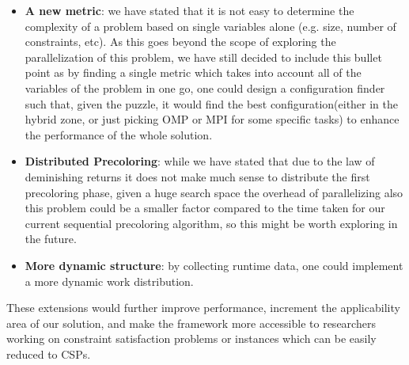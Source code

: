 \begin{itemize}
    \item \textbf{A new metric}: we have stated that it is not easy to determine the complexity of a problem based on single variables alone (e.g. size, number of constraints, etc). As this goes beyond the scope of exploring the parallelization of this problem, we have still decided to include this bullet point as by finding a single metric which takes into account all of the variables of the problem in one go, one could design a configuration finder such that, given the puzzle, it would find the best configuration(either in the hybrid zone, or just picking OMP or MPI for some specific tasks) to enhance the performance of the whole solution.

    \item \textbf{Distributed Precoloring}: while we have stated that due to the law of deminishing returns it does not make much sense to distribute the first precoloring phase, given a huge search space the overhead of parallelizing also this problem could be a smaller factor compared to the time taken for our current sequential precoloring algorithm, so this might be worth exploring in the future.
    \item \textbf{More dynamic structure}: by collecting runtime data, one could implement a more dynamic work distribution.
\end{itemize}

These extensions would further improve performance, increment the applicability area of our solution, and make the framework more accessible to researchers working on constraint satisfaction problems or instances which can be easily reduced to CSPs.